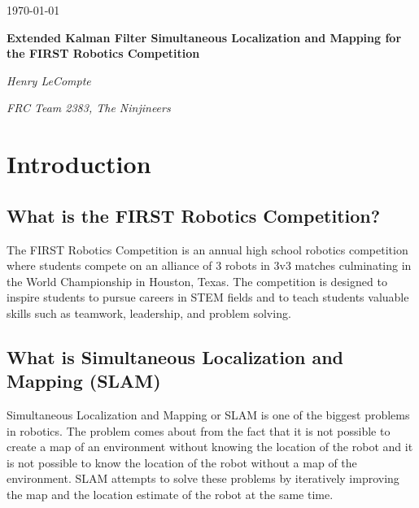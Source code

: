 \documentclass{scrartcl}
\begin{document}
\begin{titlepage}
    \centering
    {\large \today\par}
    \vfill

    {\huge\bfseries Extended Kalman Filter Simultaneous Localization and Mapping for the FIRST Robotics Competition\par}
    \vfill

    {\Large\itshape Henry LeCompte}\par
    {\itshape FRC Team 2383, The Ninjineers}\par
    \vspace{1.5cm}

    \vfill
\end{titlepage}

\newpage

\doublespacing
\tableofcontents
\singlespacing

\newpage

\doublespacing

\section{Introduction}
\subsection{What is the FIRST Robotics Competition?}
The FIRST Robotics Competition is an annual high school robotics competition where students compete on an alliance of 3 robots in 3v3 matches culminating in the World Championship in Houston, Texas. The competition is designed to inspire students to pursue careers in STEM fields and to teach students valuable skills such as teamwork, leadership, and problem solving.

\subsection{What is Simultaneous Localization and Mapping (SLAM)}
Simultaneous Localization and Mapping or SLAM is one of the biggest problems in robotics. The problem comes about from the fact that it is not possible to create a map of an environment without knowing the location of the robot and it is not possible to know the location of the robot without a map of the environment. SLAM attempts to solve these problems by iteratively improving the map and the location estimate of the robot at the same time.
\end{document}
